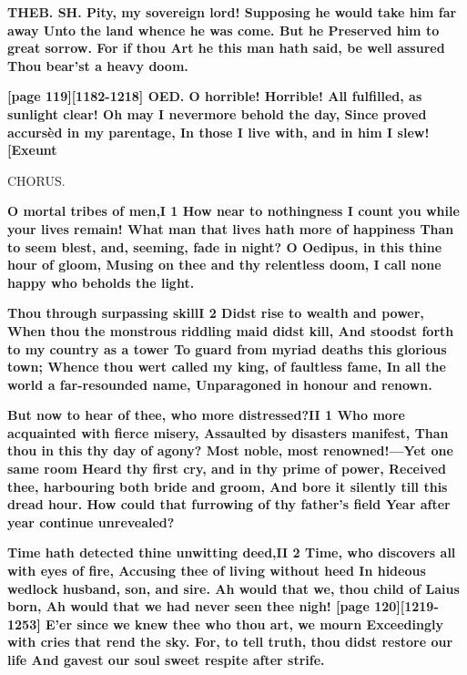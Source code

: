 \documentclass[11pt,letter]{book}
\begin{document}
\par \textbf{THEB. SH. Pity, my sovereign lord! Supposing he would take him far away Unto the land whence he was come. But he Preserved him to great sorrow. For if thou Art he this man hath said, be well assured Thou bear’st a heavy doom.}
\par 

\par \textbf{[page 119][1182-1218] OED. O horrible! Horrible! All fulfilled, as sunlight clear! Oh may I nevermore behold the day, Since proved accursèd in my parentage, In those I live with, and in him I slew![Exeunt}
\par 

\par  CHORUS.

\par \textbf{O mortal tribes of men,I 1 How near to nothingness I count you while your lives remain! What man that lives hath more of happiness Than to seem blest, and, seeming, fade in night? O Oedipus, in this thine hour of gloom, Musing on thee and thy relentless doom, I call none happy who beholds the light.}
\par 

\par \textbf{Thou through surpassing skillI 2 Didst rise to wealth and power, When thou the monstrous riddling maid didst kill, And stoodst forth to my country as a tower To guard from myriad deaths this glorious town; Whence thou wert called my king, of faultless fame, In all the world a far-resounded name, Unparagoned in honour and renown.}
\par 

\par \textbf{But now to hear of thee, who more distressed?II 1 Who more acquainted with fierce misery, Assaulted by disasters manifest, Than thou in this thy day of agony? Most noble, most renowned!—Yet one same room Heard thy first cry, and in thy prime of power, Received thee, harbouring both bride and groom, And bore it silently till this dread hour. How could that furrowing of thy father’s field Year after year continue unrevealed?}
\par 

\par \textbf{Time hath detected thine unwitting deed,II 2 Time, who discovers all with eyes of fire, Accusing thee of living without heed In hideous wedlock husband, son, and sire. Ah would that we, thou child of Laius born, Ah would that we had never seen thee nigh! [page 120][1219-1253] E’er since we knew thee who thou art, we mourn Exceedingly with cries that rend the sky. For, to tell truth, thou didst restore our life And gavest our soul sweet respite after strife.}
\par 
\end{document}
